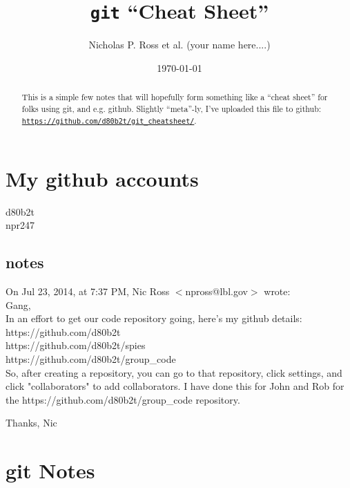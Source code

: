 \documentclass[11pt,a4paper]{article}
\begin{document}
\title{{\tt git} ``Cheat Sheet''}
\author{Nicholas P. Ross et al. (your name here....)}
\date{\today}
\maketitle



\begin{abstract}
This is a simple few notes that will hopefully form something like a ``cheat sheet'' for 
folks using git, and e.g. github. Slightly ``meta''-ly, I've uploaded this file to github:\\
\href{https://github.com/d80b2t/git\_cheatsheet}{{\tt https://github.com/d80b2t/git\_cheatsheet/}}.
\end{abstract}


\section{My github accounts}
d80b2t\\
npr247\\



\subsection{notes}
On Jul 23, 2014, at 7:37 PM, Nic Ross $<$npross@lbl.gov$>$ wrote:\\

Gang, \\

In an effort to get our code repository going, here's my github details: \\
	https://github.com/d80b2t \\
	https://github.com/d80b2t/spies\\
	https://github.com/d80b2t/group\_code\\

So, after creating a repository, you can go to that repository, click 
settings, and click "collaborators" to add collaborators. I have 
done this for John and Rob for the https://github.com/d80b2t/group\_code
repository. 

Thanks, 
Nic



\section{git Notes}
\end{document}
